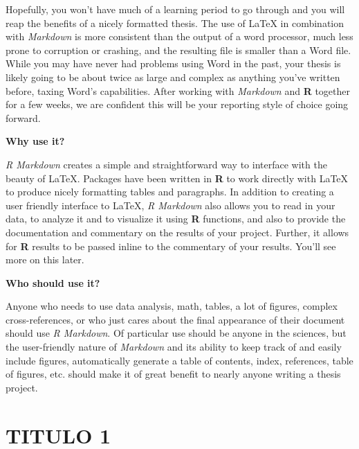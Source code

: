 \documentclass[grad,numbers]{coppe}
\begin{document}
  Hopefully, you won't have much of a learning period to go through and you will reap the benefits of a nicely formatted thesis. The use of LaTeX in combination with \emph{Markdown} is more consistent than the output of a word processor, much less prone to corruption or crashing, and the resulting file is smaller than a Word file. While you may have never had problems using Word in the past, your thesis is likely going to be about twice as large and complex as anything you've written before, taxing Word's capabilities. After working with \emph{Markdown} and \textbf{R} together for a few weeks, we are confident this will be your reporting style of choice going forward.
  
  \textbf{Why use it?}
  
  \emph{R Markdown} creates a simple and straightforward way to interface with the beauty of LaTeX. Packages have been written in \textbf{R} to work directly with LaTeX to produce nicely formatting tables and paragraphs. In addition to creating a user friendly interface to LaTeX, \emph{R Markdown} also allows you to read in your data, to analyze it and to visualize it using \textbf{R} functions, and also to provide the documentation and commentary on the results of your project. Further, it allows for \textbf{R} results to be passed inline to the commentary of your results. You'll see more on this later.
  
  \textbf{Who should use it?}
  
  Anyone who needs to use data analysis, math, tables, a lot of figures, complex cross-references, or who just cares about the final appearance of their document should use \emph{R Markdown}. Of particular use should be anyone in the sciences, but the user-friendly nature of \emph{Markdown} and its ability to keep track of and easily include figures, automatically generate a table of contents, index, references, table of figures, etc. should make it of great benefit to nearly anyone writing a thesis project.
  
  \hypertarget{titulo-1}{%
  \chapter{TITULO 1}\label{titulo-1}}
  
\end{document}
